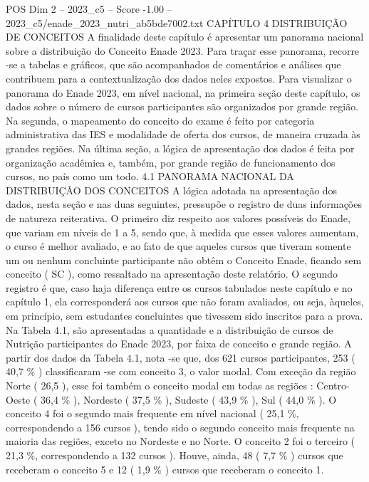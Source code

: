 \begin{textsample}{POS Dim 2 – 2023\_c5 – Score -1.00 – 2023\_c5/enade\_2023\_nutri\_ab5bde7002.txt}  \label{ex:f2_pos_260}
CAPÍTULO 4 DISTRIBUIÇÃO DE CONCEITOS A finalidade deste capítulo é apresentar um panorama nacional sobre a distribuição do Conceito Enade 2023.
Para traçar esse panorama, recorre -se a tabelas e gráficos, que são acompanhados de comentários e análises que contribuem para a contextualização dos dados neles expostos.
Para visualizar o panorama do Enade 2023, em nível nacional, na primeira seção deste capítulo, os dados sobre o número de cursos participantes são organizados por grande região.
Na segunda, o mapeamento do conceito do exame é feito por categoria administrativa das IES e modalidade de oferta dos cursos, de maneira cruzada às grandes regiões.
Na última seção, a lógica de apresentação dos dados é feita por organização acadêmica e, também, por grande região de funcionamento dos cursos, no país como um todo. 4.1 PANORAMA NACIONAL DA DISTRIBUIÇÃO DOS CONCEITOS A lógica adotada na apresentação dos dados, nesta seção e nas duas seguintes, pressupõe o registro de duas informações de natureza reiterativa.
O primeiro diz respeito aos valores possíveis do Enade, que variam em níveis de 1 a 5, sendo que, à medida que esses valores aumentam, o curso é melhor avaliado, e ao fato de que aqueles cursos que tiveram somente um ou nenhum concluinte participante não obtêm o Conceito Enade, ficando sem conceito ( SC ), como ressaltado na apresentação deste relatório.
O segundo registro é que, caso haja diferença entre os cursos tabulados neste capítulo e no capítulo 1, ela corresponderá aos cursos que não foram avaliados, ou seja, àqueles, em princípio, sem estudantes concluintes que tivessem sido inscritos para a prova.
Na Tabela 4.1, são apresentadas a quantidade e a distribuição de cursos de Nutrição participantes do Enade 2023, por faixa de conceito e grande região.
A partir dos dados da Tabela 4.1, nota -se que, dos 621 cursos participantes, 253 ( 40,7 \% ) classificaram -se com conceito 3, o valor modal.
Com exceção da região Norte ( 26,5 ), esse foi também o conceito modal em todas as regiões : Centro-Oeste ( 36,4 \% ), Nordeste ( 37,5 \% ), Sudeste ( 43,9 \% ), Sul ( 44,0 \% ).
O conceito 4 foi o segundo mais frequente em nível nacional ( 25,1 \%, correspondendo a 156 cursos ), tendo sido o segundo conceito mais frequente na maioria das regiões, exceto no Nordeste e no Norte.
O conceito 2 foi o terceiro ( 21,3 \%, correspondendo a 132 cursos ).
Houve, ainda, 48 ( 7,7 \% ) cursos que receberam o conceito 5 e 12 ( 1,9 \% ) cursos que receberam o conceito 1.

\end{textsample}
